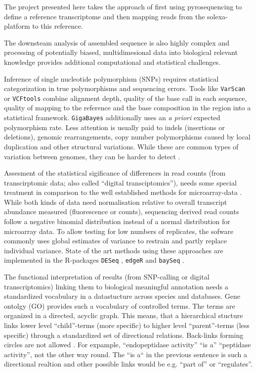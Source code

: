 The project presented here takes the approach of first using
pyrosequencing to define a reference transcriptome and then mapping
reads from the solexa-platform to this reference.

The downsteam analysis of assembled sequence is also highly complex
and processing of potentially biased, multidimesional data into
biological relevant knowledge provides additional computational and
statistical challenges.

Inference of single nucleotide polymorphism (SNPs) requires
statistical categorization in true polymorphisms and sequencing
errors. Tools like \texttt{VarScan} \cite{pmid19542151} or
\texttt{VCFtools} \cite{pmid21653522} combine alignment depth, quality
of the base call in each sequence, quality of mapping to the reference
and the base composition in the region into a statistical
framework. \texttt{GigaBayes} \cite{pmid18204455} additionally uses an
\textit{a priori} expected polymorphism rate. Less attention is
usually paid to indels (insertions or deletions), genomic
rearrangements, copy number polymorphisms caused by local duplication
and other structural variations. While these are common types of
variation between genomes, they can be harder to detect
\cite{pmid22084086}.

Assesment of the statistical sigificance of differences in read counts
(from transcirptomic data; also called ``digital transciptomics''),
needs some special treatment in comparison to the well established
methods for microarray-data \cite{smyth2005limma}. While both kinds of
data need normalisation relative to overall transcript abundance
measured (fluorescence or counts), sequencing derived read counts
follow a negative binomial distribution \cite{pmid17728317} instead of
a normal distribution for microarray data. To allow testing for low
numbers of replicates, the sofware commonly uses global estimates of
variance to restrain and partly replace individual variance. State of
the art methods using these approaches are implemented in the
R-packages \texttt{DESeq} \cite{pmid20979621}, \texttt{edgeR}
\cite{pmid19910308} and \texttt{baySeq} \cite{pmid20698981}.

The functional interpretation of results (from SNP-calling or digital
transcriptomics) linking them to biological meaningful annotation
needs a standardized vocabulary in a datastucture across species and
databases. Gene ontolgy (GO) provides such a vocabulary of controlled
terms. The terms are organized in a directed, acyclic graph. This
means, that a hierarchical stucture links lower level ``child''-terms
(more specific) to higher level ``parent''-terms (less specific)
through a standardized set of directional relations. Back-links
forming circles are not allowed \cite{pmid10802651,pmid22123736}. For
expample, ``endopeptidase activity'' ``is a'' ``peptidase activity'',
not the other way round. The ``is a`` in the previous sentence is such
a directional realtion and other possible links would be e.g. ``part
of'' or ``regulates''.


